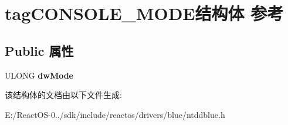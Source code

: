 \hypertarget{structtag_c_o_n_s_o_l_e___m_o_d_e}{}\section{tag\+C\+O\+N\+S\+O\+L\+E\+\_\+\+M\+O\+D\+E结构体 参考}
\label{structtag_c_o_n_s_o_l_e___m_o_d_e}
\subsection*{Public 属性}
\begin{DoxyCompactItemize}
\item 
\mbox{\label{structtag_c_o_n_s_o_l_e___m_o_d_e_abd0d886dbf58414861dd9877533fc3fd}} 
U\+L\+O\+NG {\bfseries dw\+Mode}
\end{DoxyCompactItemize}


该结构体的文档由以下文件生成\+:\begin{DoxyCompactItemize}
\item 
E\+:/\+React\+O\+S-\/0../sdk/include/reactos/drivers/blue/ntddblue.\+h\end{DoxyCompactItemize}
